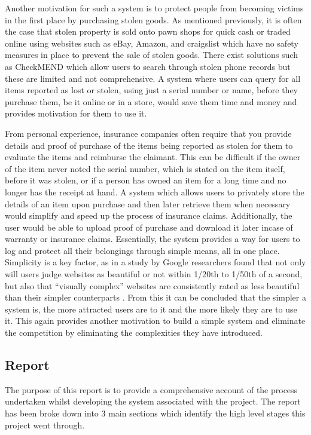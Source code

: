 Another motivation for such a system is to protect people from becoming victims in the first place by purchasing stolen goods. As mentioned previously, it is often the case that stolen property is sold onto pawn shops for quick cash or traded online using websites such as eBay, Amazon, and craigslist which have no safety measures in place to prevent the sale of stolen goods. There exist solutions such as CheckMEND which allow users to search through stolen phone records but these are limited and not comprehensive. A system where users can query for all items reported as lost or stolen, using just a serial number or name, before they purchase them, be it online or in a store, would save them time and money and provides motivation for them to use it. 

From personal experience, insurance companies often require that you provide details and proof of purchase of the items being reported as stolen for them to evaluate the items and reimburse the claimant. This can be difficult if the owner of the item never noted the serial number, which is stated on the item itself, before it was stolen, or if a person has owned an item for a long time and no longer has the receipt at hand. A system which allows users to privately store the details of an item upon purchase and then later retrieve them when necessary would simplify and speed up the process of insurance claims. Additionally, the user would be able to upload proof of purchase and download it later incase of warranty or insurance claims. Essentially, the system provides a way for users to log and protect all their belongings through simple means, all in one place. Simplicity is a key factor, as in a study by Google researchers found that not only will users judge websites as beautiful or not within 1/20th to 1/50th of a second, but also that “visually complex” websites are consistently rated as less beautiful than their simpler counterparts \cite{Google:SimplicityStudy}. From this it can be concluded that the simpler a system is, the more attracted users are to it and the more likely they are to use it. This again provides another motivation to build a simple system and eliminate the competition by eliminating the complexities they have introduced.

\subsection{Report}
The purpose of this report is to provide a comprehensive account of the process undertaken whilst developing the system associated with the project. The report has been broke down into 3 main sections which identify the high level stages this project went through.

